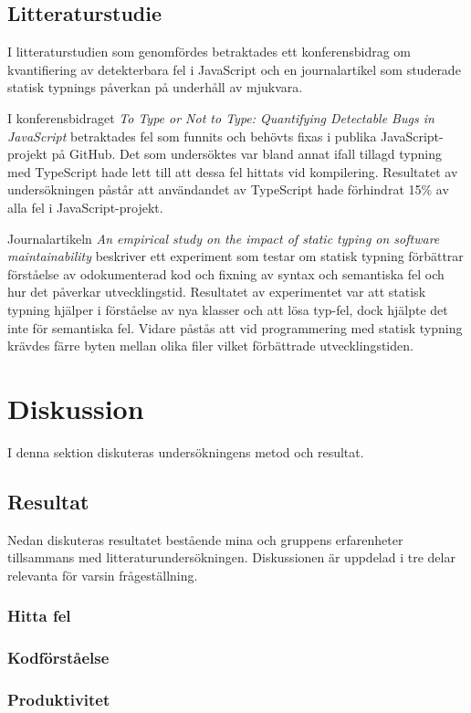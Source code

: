 \subsection{Litteraturstudie}
I litteraturstudien som genomfördes betraktades ett konferensbidrag om kvantifiering av detekterbara fel i JavaScript och en journalartikel som studerade statisk typnings påverkan på underhåll av mjukvara.

I konferensbidraget \textit{To Type or Not to Type:
Quantifying Detectable Bugs in JavaScript} \cite{henrik_totypeornot} betraktades fel som funnits och behövts fixas i publika JavaScript-projekt på GitHub. Det som undersöktes var bland annat ifall tillagd typning med TypeScript hade lett till att dessa fel hittats vid kompilering.
Resultatet av undersökningen påstår att användandet av TypeScript hade förhindrat 15\% av alla fel i JavaScript-projekt.

Journalartikeln \textit{An empirical study on the impact of static typing
on software maintainability} \cite{henrik_maintainability} beskriver ett experiment som testar om statisk typning förbättrar förståelse av odokumenterad kod och fixning av syntax och semantiska fel och hur det påverkar utvecklingstid.
Resultatet av experimentet var att statisk typning hjälper i förståelse av nya klasser och att lösa typ-fel, dock hjälpte det inte för semantiska fel. Vidare påstås att vid programmering med statisk typning krävdes färre byten mellan olika filer vilket förbättrade utvecklingstiden.

\section{Diskussion}
I denna sektion diskuteras undersökningens metod och resultat.
\subsection{Resultat}
Nedan diskuteras resultatet bestående mina och gruppens erfarenheter tillsammans med litteraturundersökningen. Diskussionen är uppdelad i tre delar relevanta för varsin frågeställning.
\subsubsection{Hitta fel}

\subsubsection{Kodförståelse}
\subsubsection{Produktivitet}
